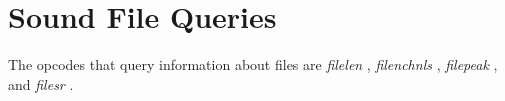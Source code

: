 \begin{comment}
\documentclass[10pt]{article}
\usepackage{fullpage, graphicx, url}
\setlength{\parskip}{1ex}
\setlength{\parindent}{0ex}
\title{Sound File Queries}



\begin{tabular}{ccc}
The Alternative Csound Reference Manual & & \\
Previous &Signal Input and Output &Next

\end{tabular}

\end{comment}
\section{Sound File Queries}


  The opcodes that query information about files are \emph{filelen}
, \emph{filenchnls}
, \emph{filepeak}
, and \emph{filesr}
. 


\begin{comment}
\begin{tabular}{lcr}
Previous &Home &Next \\
Printing and Display &Up &Signal Modifiers

\end{tabular}



\end{comment}
